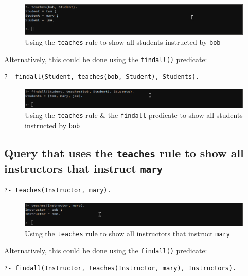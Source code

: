 \documentclass[a4paper]{article}
\begin{document}
\begin{figure}[H]
    \includegraphics[width=\textwidth]{./images/q1.2.png}
    \caption{Using the \texttt{teaches} rule to show all students instructed by \texttt{bob}}
\end{figure}

Alternatively, this could be done using the \texttt{findall()} predicate:
\begin{verbatim}
?- findall(Student, teaches(bob, Student), Students).
\end{verbatim}

\begin{figure}[H]
    \includegraphics[width=\textwidth]{./images/q1_2_findall.png}
    \caption{Using the \texttt{teaches} rule \& the \texttt{findall} predicate to show all students instructed by \texttt{bob}}
\end{figure}

\subsection{Query that uses the \texttt{teaches} rule to show all instructors that instruct \texttt{mary}}
\begin{verbatim}
?- teaches(Instructor, mary).
\end{verbatim}

\begin{figure}[H]
    \includegraphics[width=\textwidth]{./images/q1_3.png}
    \caption{Using the \texttt{teaches} rule to show all instructors that instruct \texttt{mary}}
\end{figure}

Alternatively, this could be done using the \texttt{findall()} predicate:
\begin{verbatim}
?- findall(Instructor, teaches(Instructor, mary), Instructors).
\end{verbatim}
\end{document}
